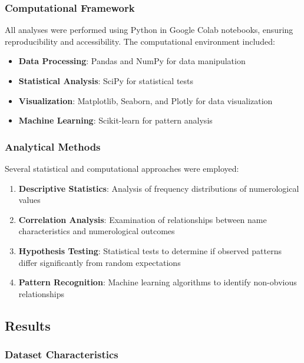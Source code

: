 \documentclass[
  american,
  11pt,
  oneside]{article}
\providecommand{\tightlist}{%
  \setlength{\itemsep}{0pt}\setlength{\parskip}{0pt}}
\begin{document}
\subsubsection{Computational Framework}\label{computational-framework}

All analyses were performed using Python in Google Colab notebooks,
ensuring reproducibility and accessibility. The computational
environment included:

\begin{itemize}
\tightlist
\item
  \textbf{Data Processing}: Pandas and NumPy for data manipulation
\item
  \textbf{Statistical Analysis}: SciPy for statistical tests
\item
  \textbf{Visualization}: Matplotlib, Seaborn, and Plotly for data
  visualization
\item
  \textbf{Machine Learning}: Scikit-learn for pattern analysis
\end{itemize}

\subsubsection{Analytical Methods}\label{analytical-methods}

Several statistical and computational approaches were employed:

\begin{enumerate}
\def\labelenumi{\arabic{enumi}.}
\tightlist
\item
  \textbf{Descriptive Statistics}: Analysis of frequency distributions
  of numerological values
\item
  \textbf{Correlation Analysis}: Examination of relationships between
  name characteristics and numerological outcomes
\item
  \textbf{Hypothesis Testing}: Statistical tests to determine if
  observed patterns differ significantly from random expectations
\item
  \textbf{Pattern Recognition}: Machine learning algorithms to identify
  non-obvious relationships
\end{enumerate}

\subsection{Results}\label{results}

\subsubsection{Dataset Characteristics}\label{dataset-characteristics}
\end{document}
